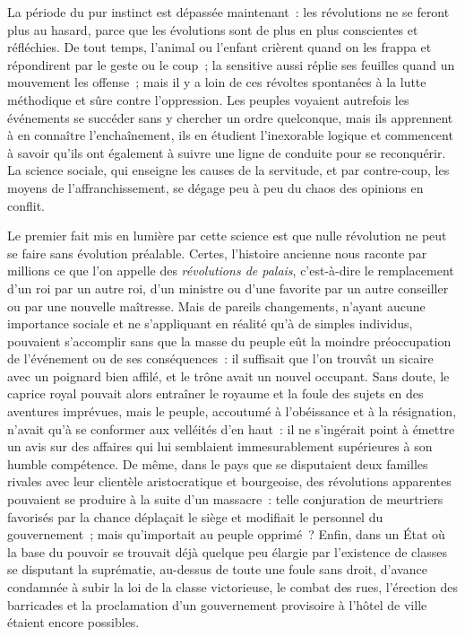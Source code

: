 \documentclass[french,twoside]{book} %
\newcommand\chaptercont{} %
\begin{document}
\chaptercont
\noindent La période du pur instinct est dépassée maintenant : les révolutions ne se feront plus au hasard, parce que les évolutions sont de plus en plus conscientes et réfléchies. De tout temps, l’animal ou l’enfant crièrent quand on les frappa et répondirent par le geste ou le coup ; la sensitive aussi réplie ses feuilles quand un mouvement les offense ; mais il y a loin de ces révoltes spontanées à la  lutte méthodique et sûre contre l’oppression. Les peuples voyaient autrefois les événements se succéder sans y chercher un ordre quelconque, mais ils apprennent à en connaître l’enchaînement, ils en étudient l’inexorable logique et commencent à savoir qu’ils ont également à suivre une ligne de conduite pour se reconquérir. La science sociale, qui enseigne les causes de la servitude, et par contre-coup, les moyens de l’affranchissement, se dégage peu à peu du chaos des opinions en conflit.\par
Le premier fait mis en lumière par cette science est que nulle révolution ne peut se faire sans évolution préalable. Certes, l’histoire ancienne nous raconte par millions ce que l’on appelle des \emph{révolutions de palais}, c’est-à-dire le  remplacement d’un roi par un autre roi, d’un ministre ou d’une favorite par un autre conseiller ou par une nouvelle maîtresse. Mais de pareils changements, n’ayant aucune importance sociale et ne s’appliquant en réalité qu’à de simples individus, pouvaient s’accomplir sans que la masse du peuple eût la moindre préoccupation de l’événement ou de ses conséquences : il suffisait que l’on trouvât un sicaire avec un poignard bien affilé, et le trône avait un nouvel occupant. Sans doute, le caprice royal pouvait alors entraîner le royaume et la foule des sujets en des aventures imprévues, mais le peuple, accoutumé à l’obéissance et à la résignation, n’avait qu’à se conformer aux velléités d’en haut : il ne s’ingérait point à émettre  un avis sur des affaires qui lui semblaient immesurablement supérieures à son humble compétence. De même, dans le pays que se disputaient deux familles rivales avec leur clientèle aristocratique et bourgeoise, des révolutions apparentes pouvaient se produire à la suite d’un massacre : telle conjuration de meurtriers favorisés par la chance déplaçait le siège et modifiait le personnel du gouvernement ; mais qu’importait au peuple opprimé ? Enfin, dans un État où la base du pouvoir se trouvait déjà quelque peu élargie par l’existence de classes se disputant la suprématie, au-dessus de toute une foule sans droit, d’avance condamnée à subir la loi de la classe victorieuse, le combat des rues, l’érection des barricades et la proclamation d’un gouvernement  provisoire à l’hôtel de ville étaient encore possibles.\par
\end{document}
